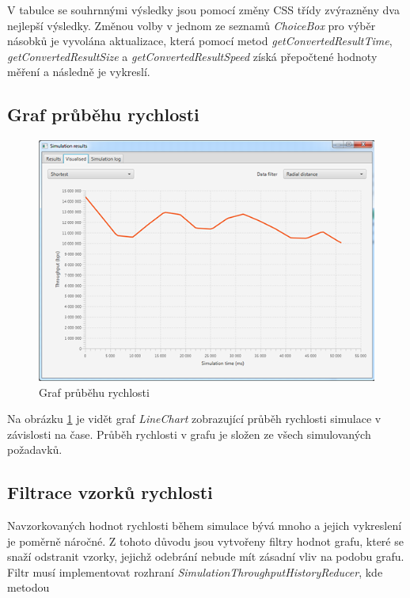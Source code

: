 \documentclass[czech,DP]{thesiskiv}
\begin{document}
V tabulce se souhrnnými výsledky jsou pomocí změny CSS třídy zvýrazněny dva nejlepší výsledky. Změnou volby v jednom ze seznamů \textit{ChoiceBox} pro výběr násobků je vyvolána aktualizace, která pomocí metod \textit{getConvertedResultTime}, \textit{getConvertedResultSize} a \textit{getConvertedResultSpeed} získá přepočtené hodnoty měření a následně je vykreslí.

\subsection{Graf průběhu rychlosti}

\begin{figure}
\centering
	\includegraphics{img/graf_rychlost_simulace.png}
\caption{Graf průběhu rychlosti}
\label{fig:graf_rychlost_simulace}
\end{figure}

Na obrázku \ref{fig:graf_rychlost_simulace} je vidět graf \textit{LineChart} zobrazující průběh rychlosti simulace v závislosti na čase. Průběh rychlosti v grafu je složen ze všech simulovaných požadavků. 

\subsection{Filtrace vzorků rychlosti} \label{filtracevzorku}

Navzorkovaných hodnot rychlosti během simulace bývá mnoho a jejich vykreslení je poměrně náročné. Z tohoto důvodu jsou vytvořeny filtry hodnot grafu, které se snaží odstranit vzorky, jejichž odebrání nebude mít zásadní vliv na podobu grafu. Filtr musí implementovat rozhraní \textit{SimulationThroughputHistoryReducer}, kde metodou
\end{document}
